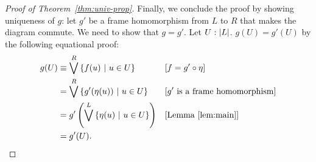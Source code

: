 \begin{proof}[Proof of Theorem~\ref{thm:univ-prop}]
  Finally, we conclude the proof by showing uniqueness of $g$: let $g'$ be a frame
  homomorphism from $L$ to $R$ that makes the diagram commute. We need to show that
  $g = g'$. Let $U\hspace{0.1mm}:\hspace{0.1mm}\left| L \right|$. $g(U) = g'(U)$ by the following equational proof:
  \begin{align*}
    g(U) &\equiv \bigvee^R \left\{  f(u) ~|~ u \in U  \right\}
            &&\text{[$f = g' \circ \eta$]} \\
         &= \bigvee^R \left\{  g'(\eta(u)) ~|~ u \in U  \right\}
            &&\text{[$g'$ is a frame homomorphism]} \\
         &= g'\left( \bigvee^L \left\{  \eta(u) ~|~ u \in U  \right\} \right)
            &&\text{[Lemma~\ref{lem:main}]} \\
         &= g'(U).
  \end{align*}
\end{proof}
